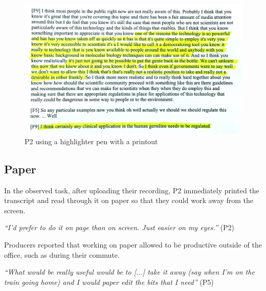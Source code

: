 


\begin{figure}[t]
\centering
  \includegraphics[width=\columnwidth]{figs/highlighting-cropped.jpg}
  \caption{P2 using a highlighter pen with a printout}
  \label{fig:highlight}
\end{figure}

\subsection{Paper}
In the observed task, after uploading their recording, P2 immediately printed the transcript and read through it on
paper so that they could work away from the screen.

\textit{``I'd prefer to do it on page than on screen. Just easier on my eyes.''} (P2)

Producers reported that working on paper allowed to be productive outside of the office, such as during their commute.

\textit{``What would be really useful would be to [...] take it away (say when I'm on the train going home) and I would
  paper edit the bits that I need''} (P5)

